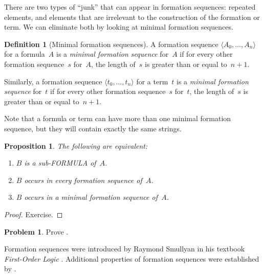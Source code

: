 \documentclass[10pt,a4paper]{article}
\makeatletter
\newcommand*{\olup}[1]{\MakeUppercase{#1}}
\theoremstyle{plain}
\newtheorem{prop}[thm]{Proposition}
\theoremstyle{definition}
\newtheorem{defn}[thm]{Definition}
\newtheorem{prob}{Problem}[section]
\theoremstyle{remark}
\newenvironment{history}{}{}
\newcommand*{\ollabel}[1]{\label{#1}}
\newcommand{\olref}{\@ifnextchar[{\olref@i}{\olref@final}}
\def\olref@i[#1]{\@ifnextchar[{\olref@ii}{\olref@final}}
\def\olref@ii[#1]{\@ifnextchar[{\olref@iii}{\olref@final}}
\def\olref@iii[#1]{\olref@final}
\def\olref@final#1{\ref{#1}}
\providecommand{\tuple}[1]{\langle #1 \rangle}
\providecommand{\citep}[1]{\cite{#1}}
\providecommand{\citet}[1]{\cite{#1}}
\makeatother
\begin{document}
There are two types of ``junk'' that can appear in formation
sequences: repeated elements, and elements that are irrelevant
to the construction of the formation or term. We can eliminate
both by looking at minimal formation sequences.

\begin{defn}[Minimal formation sequences]
\ollabel{defn:minimal-fseq}
A formation sequence $\tuple{A_0, \ldots, A_n}$ for a
formula~$A$ is a \emph{minimal formation sequence} for~$A$
if for every other formation sequence~$s$ for~$A$,
the length of~$s$ is greater than or equal to~$n+1$.

Similarly, a formation sequence $\tuple{t_0, \ldots, t_n}$
for a term~$t$ is a \emph{minimal formation sequence}
for~$t$ if for every other formation sequence~$s$ for~$t$,
the length of~$s$ is greater than or equal to~$n+1$.
\end{defn}

Note that a formula or term can have more than one minimal
formation sequence, but they will contain exactly the same
strings.

\begin{prop}
\ollabel{prop:subformula-equivs}
The following are equivalent:
\begin{enumerate}
    \item $B$ is a sub-\olup{formula} of~$A$.
    \item $B$ occurs in every formation sequence of~$A$.
    \item $B$ occurs in a minimal formation sequence of~$A$.
\end{enumerate}
\end{prop}

\begin{proof}
Exercise.
\end{proof}

\begin{prob}
Prove \olref[fol][syn][fseq]{prop:subformula-equivs}.
\end{prob}

\begin{history}
Formation sequences were introduced by Raymond Smullyan in his
textbook \emph{First-Order Logic} \citep{Smullyan1968}.
Additional properties of formation sequences were established by
\citet{Zuckerman1973}.
\end{history}


\end{document}
